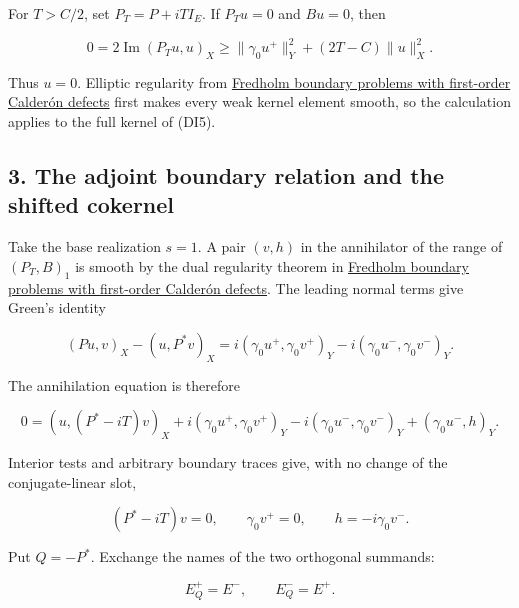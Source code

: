 \documentclass[
  11pt,
]{article}
\makeatletter
\let\ReaderOriginalAnchorStart\hyper@anchorstart
\let\ReaderOriginalAnchorEnd\hyper@anchorend
\let\ReaderPendingAliases\@empty
\def\ReaderArmAliases#1{\gdef\ReaderPendingAliases{#1}}
\def\hyper@anchorstart#1{\ReaderIfNativeAnchorTF{#1}{\ReaderPendingAliases\global\let\ReaderPendingAliases\@empty}{}\ReaderOriginalAnchorStart{#1}}
\makeatother
\begin{document}
For \(T>C/2\), set \(P_T=P+iT I_E\). If \(P_Tu=0\) and \(Bu=0\), then

\[
 0=2\operatorname{Im}(P_Tu,u)_X
 \geq\|\gamma_0u^+\|_Y^2+(2T-C)\|u\|_X^2.
 \tag{DI8}
\]

Thus \(u=0\). Elliptic regularity from
\href{generalized-collar-fredholm.pdf}{Fredholm boundary problems with
first-order Calderón defects} first makes every weak kernel element
smooth, so the calculation applies to the full kernel of (DI5).

\ReaderArmAliases{\ReaderOriginalAnchorStart{AN03-SDI-003}\ReaderOriginalAnchorEnd\begingroup\expandafter\def\csname @currentHref\endcsname{AN03-SDI-003}\label{AN03-SDI-003}\endgroup\ReaderOriginalAnchorStart{3-the-adjoint-boundary-relation-and-the-shifted-cokernel}\ReaderOriginalAnchorEnd\begingroup\expandafter\def\csname @currentHref\endcsname{3-the-adjoint-boundary-relation-and-the-shifted-cokernel}\label{3-the-adjoint-boundary-relation-and-the-shifted-cokernel}\endgroup\ReaderOriginalAnchorStart{the-adjoint-boundary-relation-and-the-shifted-cokernel}\ReaderOriginalAnchorEnd}
\subsection{3. The adjoint boundary relation and the shifted
cokernel}\label{the-adjoint-boundary-relation-and-the-shifted-cokernel}

Take the base realization \(s=1\). A pair \((v,h)\) in the annihilator
of the range of \((P_T,B)_1\) is smooth by the dual regularity theorem
in \href{generalized-collar-fredholm.pdf}{Fredholm boundary problems with
first-order Calderón defects}. The leading normal terms give Green's
identity

\[
 (Pu,v)_X-(u,P^*v)_X
 =i(\gamma_0u^+,\gamma_0v^+)_Y
  -i(\gamma_0u^-,\gamma_0v^-)_Y.
 \tag{DI9}
\]

The annihilation equation is therefore

\[
 0=(u,(P^*-iT)v)_X
   +i(\gamma_0u^+,\gamma_0v^+)_Y
   -i(\gamma_0u^-,\gamma_0v^-)_Y
   +(\gamma_0u^-,h)_Y.
 \tag{DI10}
\]

Interior tests and arbitrary boundary traces give, with no change of the
conjugate-linear slot,

\[
 (P^*-iT)v=0,\qquad
 \gamma_0v^+=0,\qquad h=-i\gamma_0v^-.
 \tag{DI11}
\]

Put \(Q=-P^*\). Exchange the names of the two orthogonal summands:

\[
 E_Q^+=E^-,\qquad E_Q^-=E^+.
 \tag{DI12}
\]
\end{document}
